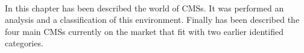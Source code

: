 \paragraph{}
In this chapter has been described the world of CMSs. It was performed an analysis and a classification of this environment. Finally has been described the four main CMSs currently on the market that fit with two earlier identified categories.